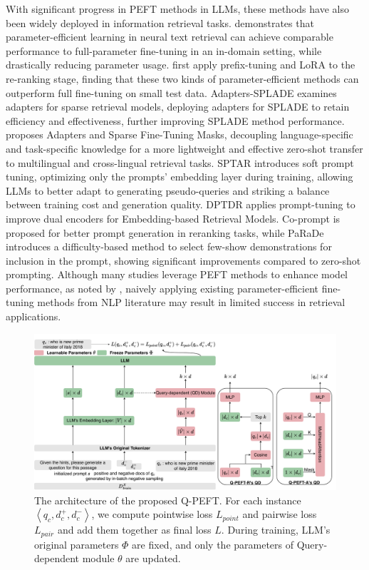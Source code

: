 \documentclass[sigconf,natbib=true,anonymous=false]{acmart}
\begin{document}
With significant progress in PEFT methods in LLMs, these methods have also been widely deployed in information retrieval tasks. \citet{DBLP:conf/emnlp/TamLJXLLDT23} demonstrates that parameter-efficient learning in neural text retrieval can achieve comparable performance to full-parameter fine-tuning in an in-domain setting, while drastically reducing parameter usage. \citet{DBLP:conf/www/JungCR22} first apply prefix-tuning and LoRA to the re-ranking stage, finding that these two kinds of parameter-efficient methods can outperform full fine-tuning on small test data. Adapters-SPLADE \cite{DBLP:conf/ecir/PalLDC23} examines adapters for sparse retrieval models, deploying adapters for SPLADE to retain efficiency and effectiveness, further improving SPLADE method performance. \citet{DBLP:conf/coling/LitschkoVG22} proposes Adapters and Sparse Fine-Tuning Masks, decoupling language-specific and task-specific knowledge for a more lightweight and effective zero-shot transfer to multilingual and cross-lingual retrieval tasks. SPTAR \cite{DBLP:journals/corr/abs-2307-08303} introduces soft prompt tuning, optimizing only the prompts’ embedding layer during training, allowing LLMs to better adapt to generating pseudo-queries and striking a balance between training cost and generation quality. DPTDR \cite{DBLP:journals/csur/LiuYFJHN23} applies prompt-tuning to improve dual encoders for Embedding-based Retrieval Models. Co-prompt \cite{DBLP:conf/acl/ChoJSP23} is proposed for better prompt generation in reranking tasks, while PaRaDe \cite{DBLP:conf/emnlp/DrozdovZD0RWAIM23} introduces a difficulty-based method to select few-show demonstrations for inclusion in the prompt, showing significant improvements compared to zero-shot prompting. Although many studies leverage PEFT methods to enhance model performance, as noted by \cite{DBLP:conf/cikm/MaGZFC22}, naively applying existing parameter-efficient fine-tuning methods from NLP literature may result in limited success in retrieval applications.

\begin{figure}[t]
\centering
\includegraphics[width=1.0\textwidth]{Figures/Q-PEFT.pdf}
\caption{The architecture of the proposed Q-PEFT. For each instance $\left\langle q_c, d_c^{+}, d_{c}^{-}\right\rangle$, we compute pointwise loss $L_{point}$ and pairwise loss $L_{pair}$ and add them together as final loss $L$. During training, LLM's original parameters $\Phi$ are fixed, and only the parameters of Query-dependent module $\theta$ are updated.}
\label{fig: q-peft}
\end{figure}
\end{document}
